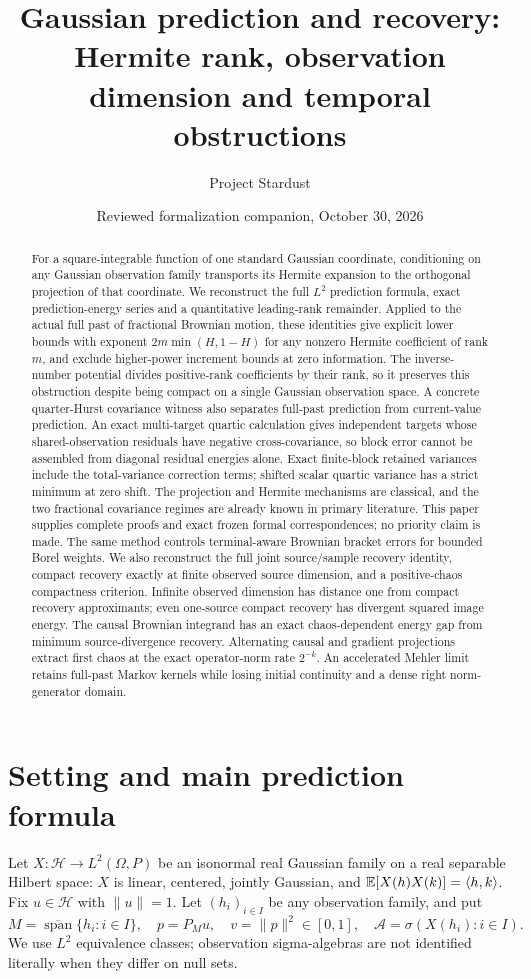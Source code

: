 \documentclass[11pt]{article}
\title{Gaussian prediction and recovery:\\Hermite rank, observation dimension and temporal obstructions}
\author{Project Stardust}
\date{Reviewed formalization companion, October 30, 2026}
\newcommand{\Hh}{\mathcal H}\newcommand{\U}{\mathcal U}
\begin{document}
\maketitle
\begin{abstract}
For a square-integrable function of one standard Gaussian coordinate,
conditioning on any Gaussian observation family transports its Hermite
expansion to the orthogonal projection of that coordinate. We reconstruct
the full $L^2$ prediction formula, exact prediction-energy series and a
quantitative leading-rank remainder. Applied to the actual full past of
fractional Brownian motion, these identities give explicit lower bounds
with exponent $2m\min(H,1-H)$ for any nonzero Hermite coefficient of rank
$m$, and exclude higher-power increment bounds at zero information.
The inverse-number potential divides positive-rank coefficients by their
rank, so it preserves this obstruction despite being compact on a single
Gaussian observation space. A concrete quarter-Hurst covariance witness
also separates full-past prediction from current-value prediction. An
exact multi-target quartic calculation gives independent targets whose
shared-observation residuals have negative cross-covariance, so block error
cannot be assembled from diagonal residual energies alone. Exact finite-block
retained variances include the total-variance correction terms; shifted
scalar quartic variance has a strict minimum at zero shift.
The projection and Hermite mechanisms are classical, and the two
fractional covariance regimes are already known in primary literature.
This paper supplies complete proofs and exact frozen formal
correspondences; no priority claim is made.
The same method controls terminal-aware Brownian bracket errors for bounded Borel weights. We also reconstruct the full joint source/sample recovery identity, compact recovery exactly at finite observed source dimension, and a positive-chaos compactness criterion. Infinite observed dimension has distance one from compact recovery approximants; even one-source compact recovery has divergent squared image energy.
The causal Brownian integrand has an exact chaos-dependent energy gap from minimum source-divergence recovery. Alternating causal and gradient projections extract first chaos at the exact operator-norm rate $2^{-k}$. An accelerated Mehler limit retains full-past Markov kernels while
losing initial continuity and a dense right norm-generator domain.
\end{abstract}

\section{Setting and main prediction formula}
Let $X:\Hh\to L^2(\Omega,P)$ be an isonormal real Gaussian family on a
real separable Hilbert space: $X$ is linear, centered, jointly Gaussian,
and $\mathbb E[X(h)X(k)]=\langle h,k\rangle$. Fix $u\in\Hh$ with $\|u\|=1$.
Let $(h_i)_{i\in I}$ be any observation family, and put
\[
 M=\overline{\operatorname{span}}\{h_i:i\in I\},\quad
 p=P_Mu,\quad v=\|p\|^2\in[0,1],\quad
 \mathcal A=\sigma(X(h_i):i\in I).
\]
We use $L^2$ equivalence classes; observation sigma-algebras are not
identified literally when they differ on null sets.
\end{document}
